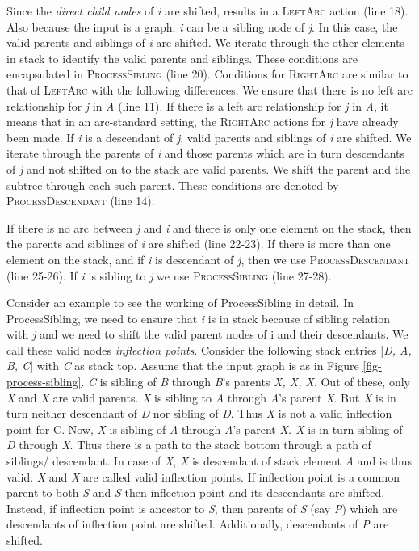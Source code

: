 \documentclass[11pt]{article}
\begin{document}
Since the {\it direct child nodes} of {\it i} are shifted,  results in a \textsc{LeftArc} action (line 18). Also because the input is a graph, {\it i} can be a sibling node of {\it j}. In this case, the valid parents and siblings of {\it i} are shifted. We iterate through the other elements in stack to identify the valid parents and siblings. These conditions are encapsulated in \textsc{ProcessSibling} (line 20). Conditions for \textsc{RightArc} are similar to that of \textsc{LeftArc} with the following differences. We ensure that there is no left arc relationship for {\it j} in {\it A} (line 11). If there is a left arc relationship for {\it j} in {\it A}, it means that in an arc-standard setting, the \textsc{RightArc} actions for {\it j} have already been made. If {\it i} is a descendant of {\it j}, valid parents and siblings of {\it i} are shifted. We iterate through the parents of {\it i} and those parents which are in turn descendants of {\it j} and not shifted on to the stack are valid parents. We shift the parent and the subtree through each such parent. These conditions are denoted by \textsc{ProcessDescendant} (line 14). 

If there is no arc between {\it j} and {\it i} and there is only one element on the stack, then the parents and siblings of {\it i} are shifted (line 22-23). If there is more than one element on the stack, and if {\it i} is descendant of {\it j}, then we use \textsc{ProcessDescendant} (line 25-26). If {\it i} is sibling to {\it j} we use \textsc{ProcessSibling} (line 27-28). 



Consider an example to see the working of {\sc ProcessSibling} in detail. In {\sc ProcessSibling}, we need to ensure that {\it i} is in stack because of sibling relation with {\it j} and we need to shift the valid parent nodes of i and their descendants. We call these valid nodes {\it inflection points}. Consider the following stack entries [{\it D, A, B, C}] with {\it C} as stack top. Assume that the input graph is as in Figure \ref{fig-process-sibling}. {\it C} is sibling of {\it B} through {\it B}'s parents {\it X, X, X}. Out of these, only {\it X} and {\it X} are valid parents.  {\it X} is sibling to {\it A} through {\it A}'s parent {\it X}. But {\it X} is in turn neither descendant of {\it D} nor sibling of {\it D}. Thus {\it X} is not a valid inflection point for {C}. Now, {\it X} is sibling of {\it A} through {\it A}'s parent {\it X. X} is in turn sibling of {\it D} through {\it X}. Thus there is a path to the stack bottom through a path of siblings/ descendant. In case of {\it X}, {\it X} is descendant of stack element {\it A} and is thus valid. {\it X} and {\it X} are called valid inflection points. If inflection point is a common parent to both {\it S} and {\it S} then inflection point and its descendants are shifted. Instead, if inflection point is ancestor to {\it S}, then parents of {\it S} (say {\it P}) which are descendants of inflection point are shifted. Additionally, descendants of {\it P} are shifted. 
\end{document}
